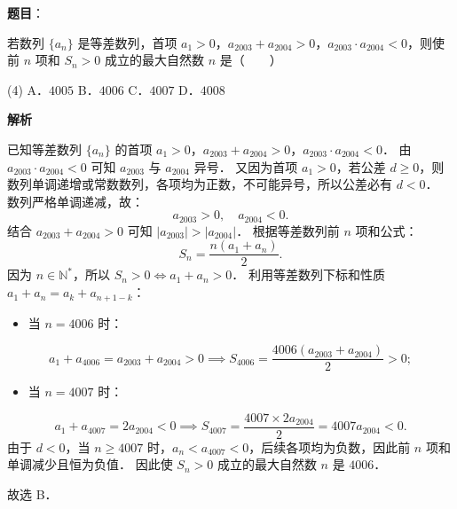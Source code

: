 \begin{answer}

\textbf{题目}：

若数列 $\{a_n\}$ 是等差数列，首项 $a_1 > 0$，$a_{2003} + a_{2004} > 0$，$a_{2003} \cdot a_{2004} < 0$，则使前 $n$ 项和 $S_n > 0$ 成立的最大自然数 $n$ 是\mbox{（　　）}

\begin{gkopts}(4)
\task A．$4005$
\task B．$4006$
\task C．$4007$
\task D．$4008$
\end{gkopts}

\textbf{解析}

已知等差数列 $\{a_n\}$ 的首项 $a_1 > 0$，$a_{2003} + a_{2004} > 0$，$a_{2003} \cdot a_{2004} < 0$．
由 $a_{2003} \cdot a_{2004} < 0$ 可知 $a_{2003}$ 与 $a_{2004}$ 异号．
又因为首项 $a_1 > 0$，若公差 $d \geqslant 0$，则数列单调递增或常数数列，各项均为正数，不可能异号，所以公差必有 $d < 0$．
数列严格单调递减，故：
\nopagebreak[4]
\[
a_{2003} > 0, \quad a_{2004} < 0.
\]
结合 $a_{2003} + a_{2004} > 0$ 可知 $|a_{2003}| > |a_{2004}|$．
根据等差数列前 $n$ 项和公式：
\nopagebreak[4]
\[
S_n = \frac{n(a_1 + a_n)}{2}.
\]
因为 $n \in \mathbb{N}^*$，所以 $S_n > 0 \iff a_1 + a_n > 0$．
利用等差数列下标和性质 $a_1 + a_n = a_k + a_{n+1-k}$：
\begin{itemize}
\item 当 $n = 4006$ 时：
\end{itemize}
\nopagebreak[4]
\[
a_1 + a_{4006} = a_{2003} + a_{2004} > 0 \implies S_{4006} = \frac{4006(a_{2003} + a_{2004})}{2} > 0;
\]
\begin{itemize}
\item 当 $n = 4007$ 时：
\end{itemize}
\nopagebreak[4]
\[
a_1 + a_{4007} = 2a_{2004} < 0 \implies S_{4007} = \frac{4007 \times 2a_{2004}}{2} = 4007 a_{2004} < 0.
\]
由于 $d < 0$，当 $n \geqslant 4007$ 时，$a_n < a_{4007} < 0$，后续各项均为负数，因此前 $n$ 项和单调减少且恒为负值．
因此使 $S_n > 0$ 成立的最大自然数 $n$ 是 $4006$．

故选 B．


\end{answer}
